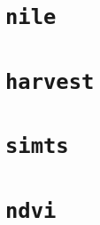 \documentclass[main.tex]{subfiles}
\begin{document}
\section{\texttt{nile}}
\label{sec:val_nile}

\section{\texttt{harvest}}
\label{sec:val_harvest}

\section{\texttt{simts}}
\label{sec:val_simts}

\section{\texttt{ndvi}}
\label{sec:val_ndvi}



\biblio
\end{document}
